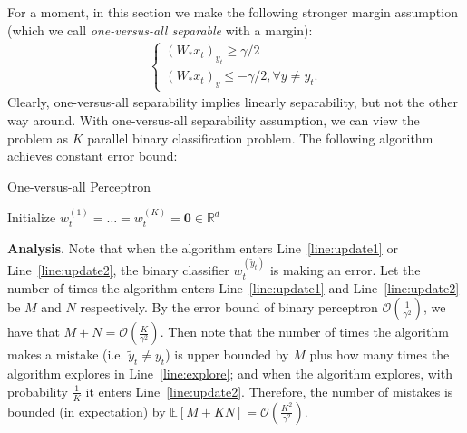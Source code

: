 \documentclass{article}
\newcommand{\field}[1]{\mathbb{#1}}
\newcommand{\E}{\field{E}}
\begin{document}
For a moment, in this section we make the following stronger margin assumption (which we call \textit{one-versus-all separable} with a margin): 
\begin{align}
\begin{cases}
    (W_*x_t)_{y_t} \geq \gamma/2 \\
    (W_*x_t)_y \leq -\gamma/2, \forall y\neq y_t.
\end{cases}
\label{eqn:stronger}
\end{align}
Clearly, one-versus-all separability implies linearly separability, but not the other way around. With one-versus-all separability assumption, we can view the problem as $K$ parallel binary classification problem. The following algorithm achieves constant error bound: 
\begin{algorithm}[H]
\caption{One-versus-all Perceptron}
\label{alg:ova}
Initialize $w_t^{(1)}=\ldots=w_t^{(K)}=\mathbf{0}\in \mathbb{R}^d$\\
\end{algorithm}
\textbf{Analysis}. Note that when the algorithm enters Line~\ref{line:update1} or Line~\ref{line:update2}, the binary classifier $w_t^{(\tilde{y}_t)}$ is making an error. Let the number of times the algorithm enters Line~\ref{line:update1} and Line~\ref{line:update2} be $M$ and $N$ respectively. By the error bound of binary perceptron $\mathcal{O}\left(\frac{1}{\gamma^2}\right)$, we have that $M+N=\mathcal{O}\left(\frac{K}{\gamma^2}\right)$. Then note that the number of times the algorithm makes a mistake (i.e. $\tilde{y}_t\neq y_t$) is upper bounded by $M$ plus how many times the algorithm explores in Line~\ref{line:explore}; and when the algorithm explores, with probability $\frac{1}{K}$ it enters Line~\ref{line:update2}. Therefore, the number of mistakes is bounded (in expectation) by $\E[M+KN]=\mathcal{O}\left(\frac{K^2}{\gamma^2}\right)$. 
\end{document}

